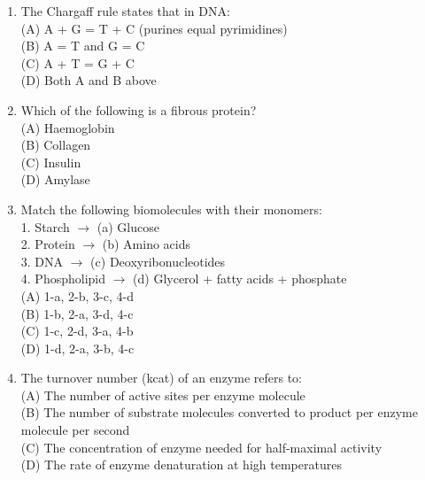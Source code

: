 \documentclass{article}
\begin{document}
\begin{enumerate}[label=Q\arabic*.]
\item The Chargaff rule states that in DNA:
\\(A) A + G = T + C (purines equal pyrimidines)
\\(B) A = T and G = C
\\(C) A + T = G + C
\\(D) Both A and B above

\item Which of the following is a fibrous protein?
\\(A) Haemoglobin
\\(B) Collagen
\\(C) Insulin
\\(D) Amylase

\item Match the following biomolecules with their monomers:\\
1. Starch $\rightarrow$ (a) Glucose\\
2. Protein $\rightarrow$ (b) Amino acids\\
3. DNA $\rightarrow$ (c) Deoxyribonucleotides\\
4. Phospholipid $\rightarrow$ (d) Glycerol + fatty acids + phosphate
\\(A) 1-a, 2-b, 3-c, 4-d
\\(B) 1-b, 2-a, 3-d, 4-c
\\(C) 1-c, 2-d, 3-a, 4-b
\\(D) 1-d, 2-a, 3-b, 4-c

\item The turnover number (kcat) of an enzyme refers to:
\\(A) The number of active sites per enzyme molecule
\\(B) The number of substrate molecules converted to product per enzyme molecule per second
\\(C) The concentration of enzyme needed for half-maximal activity
\\(D) The rate of enzyme denaturation at high temperatures

\end{enumerate}
\end{document}
